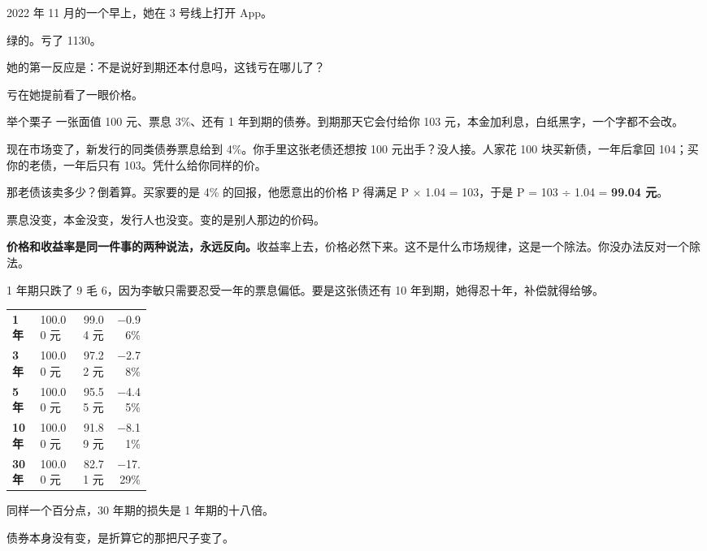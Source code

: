 2022 年 11 月的一个早上，她在 3 号线上打开 App。

绿的。亏了 1130。

她的第一反应是：不是说好到期还本付息吗，这钱亏在哪儿了？

亏在她提前看了一眼价格。

\begin{egbox}{举个栗子}
一张面值 100 元、票息 3\%、还有 1 年到期的债券。到期那天它会付给你 103 元，本金加利息，白纸黑字，一个字都不会改。

现在市场变了，新发行的同类债券票息给到 4\%。你手里这张老债还想按 100 元出手？没人接。人家花 100 块买新债，一年后拿回 104；买你的老债，一年后只有 103。凭什么给你同样的价。

那老债该卖多少？倒着算。买家要的是 4\% 的回报，他愿意出的价格 P 得满足 P × 1.04 = 103，于是 P = 103 ÷ 1.04 = \textbf{99.04 元}。

票息没变，本金没变，发行人也没变。变的是别人那边的价码。

\end{egbox}

\textbf{价格和收益率是同一件事的两种说法，永远反向。}收益率上去，价格必然下来。这不是什么市场规律，这是一个除法。你没办法反对一个除法。

1 年期只跌了 9 毛 6，因为李敏只需要忍受一年的票息偏低。要是这张债还有 10 年到期，她得忍十年，补偿就得给够。

\begin{tablewrap}
\begin{xltabular}{\linewidth}{>{\raggedright\arraybackslash}p{0.20\linewidth}Xrr}
\toprule
{} &  &  &  \\
\midrule
\textbf{1 年} & 100.00 元 & 99.04 元 & −0.96\% \\
\textbf{3 年} & 100.00 元 & 97.22 元 & −2.78\% \\
\textbf{5 年} & 100.00 元 & 95.55 元 & −4.45\% \\
\textbf{10 年} & 100.00 元 & 91.89 元 & −8.11\% \\
\textbf{30 年} & 100.00 元 & 82.71 元 & −17.29\% \\
\bottomrule
\end{xltabular}
\end{tablewrap}

同样一个百分点，30 年期的损失是 1 年期的十八倍。

\begin{pullquote}{}
债券本身没有变，是折算它的那把尺子变了。
\end{pullquote}


